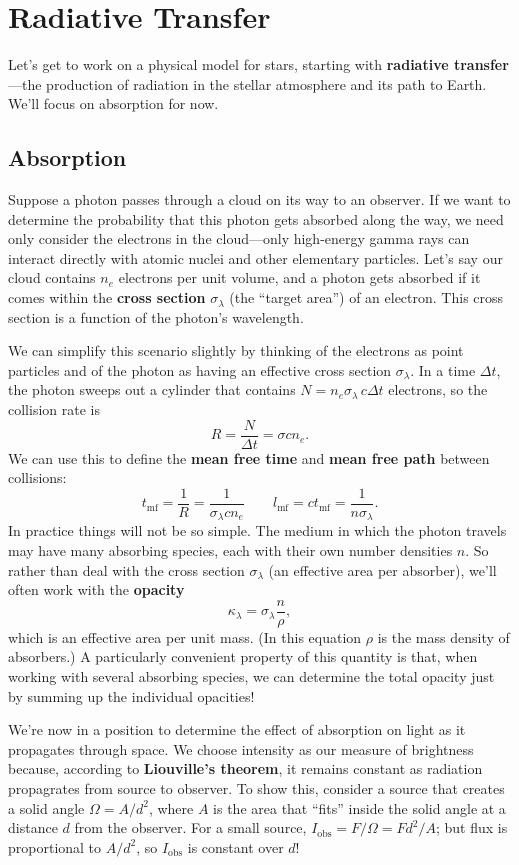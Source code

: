 \documentclass[../a062main.tex]{subfiles}
\begin{document}
\section{Radiative Transfer}
Let's get to work on a physical model for stars, starting with \textbf{radiative transfer}---the production of radiation in the stellar atmosphere and its path to Earth.
We'll focus on absorption for now.

\subsection*{Absorption}
Suppose a photon passes through a cloud on its way to an observer.
If we want to determine the probability that this photon gets absorbed along the way, we need only consider the electrons in the cloud---only high-energy gamma rays can interact directly with atomic nuclei and other elementary particles.
Let's say our cloud contains $n_e$ electrons per unit volume, and a photon gets absorbed if it comes within the \textbf{cross section} $\sigma_\lambda$ (the ``target area'') of an electron.
This cross section is a function of the photon's wavelength.

We can simplify this scenario slightly by thinking of the electrons as point particles and of the photon as having an effective cross section $\sigma_\lambda$.
In a time $\Delta t$, the photon sweeps out a cylinder that contains $N = n_e \sigma_\lambda \,c\Delta t$ electrons, so the collision rate is
\[ R = \frac{N}{\Delta t} = \sigma c n_e. \]
We can use this to define the \textbf{mean free time} and \textbf{mean free path} between collisions:
\[ t_\textrm{mf} = \frac{1}{R} = \frac{1}{\sigma_\lambda c n_e} \qquad l_\textrm{mf} = ct_\textrm{mf} = \frac{1}{n \sigma_\lambda}. \]
In practice things will not be so simple.
The medium in which the photon travels may have many absorbing species, each with their own number densities $n$.
So rather than deal with the cross section $\sigma_\lambda$ (an effective area per absorber), we'll often work with the \textbf{opacity}
\[ \boxed{\kappa_\lambda = \sigma_\lambda \frac{n}{\rho}}, \]
which is an effective area per unit mass.
(In this equation $\rho$ is the mass density of absorbers.)
A particularly convenient property of this quantity is that, when working with several absorbing species, we can determine the total opacity just by summing up the individual opacities!

We're now in a position to determine the effect of absorption on light as it propagates through space.
We choose intensity as our measure of brightness because, according to \textbf{Liouville's theorem}, it remains constant as radiation propagrates from source to observer.
To show this, consider a source that creates a solid angle $\Omega = A / d^2$, where $A$ is the area that ``fits'' inside the solid angle at a distance $d$ from the observer.
For a small source, $I_\textrm{obs} = F / \Omega = Fd^2 / A$; but flux is proportional to $A / d^2$, so $I_\textrm{obs}$ is constant over $d$!
\end{document}
